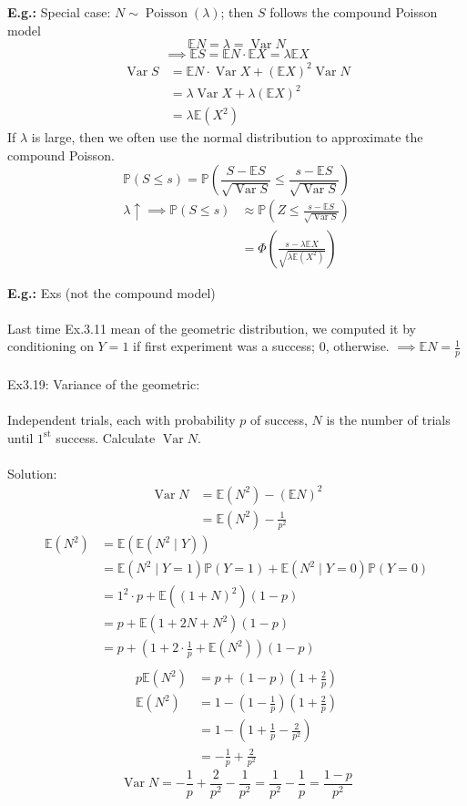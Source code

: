 \documentclass[a4paper]{article}
\newcommand{\n}{\hfill\break}
\newcommand{\eg}[1]{\par\noindent\settowidth{\hangindent}{\textbf{E.g.: }}\textbf{E.g.: }#1\n}
\newcommand{\Prob}{\mathbb{P}}
\renewcommand{\P}{\Prob}
\newcommand{\Avg}{\mathbb{E}}
\newcommand{\E}{\Avg}
\DeclareMathOperator{\Var}{Var}
\DeclareMathOperator{\Poiss}{\text{Poisson}}
\begin{document}
\eg{
    Special case: $N\sim\Poiss(\lambda)$; then $S$ follows the compound Poisson model
    \[\E N=\lambda=\Var N\]
    \[\implies\E S=\E N\cdot\E X=\lambda\E X\]
    \begin{align*}
        \Var S&=\E N\cdot\Var X+(\E X)^2\Var N \\
        &=\lambda\Var X+\lambda(\E X)^2 \\
        &=\lambda\E(X^2)
    \end{align*}
    If $\lambda$ is large, then we often use the normal distribution to approximate the compound Poisson.
    \[\P(S\leq s)=\P\left(\frac{S-\E S}{\sqrt{\Var S}}\leq\frac{s-\E S}{\sqrt{\Var S}}\right)\]
    \begin{align*}
        \lambda\uparrow\implies\P(S\leq s)&\approx\P\left(Z\leq \frac{s-\E S}{\sqrt{\Var S}}\right) \\
        &=\Phi\left(\frac{s-\lambda\E X}{\sqrt{\lambda\E(X^2)}}\right)
    \end{align*}
}

\eg{
    Exs (not the compound model)
    \\\\
    Last time Ex.3.11 mean of the geometric distribution, we computed it by conditioning on $Y=1$ if first experiment was a success; 0, otherwise. $\implies\E N=\frac{1}{p}$
    \\\\
    Ex3.19: Variance of the geometric:
    \\\\
    Independent trials, each with probability $p$ of success, $N$ is the number of trials until $1^\text{st}$ success. Calculate $\Var N$.
    \\\\
    Solution:
    \begin{align*}
        \Var N&=\E(N^2)-(\E N)^2 \\
        &=\E(N^2)-\frac{1}{p^2}
    \end{align*}
    \begin{align*}
        \E(N^2)&=\E(\E(N^2\mid Y)) \\
        &=\E(N^2\mid Y=1)\P(Y=1)+\E(N^2\mid Y=0)\P(Y=0) \\
        &=1^2\cdot p+\E((1+N)^2)(1-p) \\
        &=p+\E(1+2N+N^2)(1-p) \\
        &=p+(1+2\cdot\frac{1}{p}+\E(N^2))(1-p) \\
    \end{align*}
    \begin{align*}
        p\E(N^2)&=p+(1-p)\left(1+\frac{2}{p}\right) \\
        \E(N^2)&=1-\left(1-\frac{1}{p}\right)\left(1+\frac{2}{p}\right) \\
        &=1-\left(1+\frac{1}{p}-\frac{2}{p^2}\right) \\
        &=-\frac{1}{p}+\frac{2}{p^2}
    \end{align*}
    \[\Var N=-\frac{1}{p}+\frac{2}{p^2}-\frac{1}{p^2}=\frac{1}{p^2}-\frac{1}{p}=\frac{1-p}{p^2}\]
}
\end{document}
